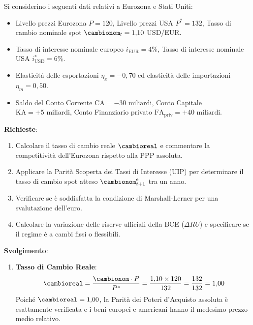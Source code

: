 \begin{esercizio}
Si considerino i seguenti dati relativi a Eurozona e Stati Uniti:
\begin{itemize}
    \item Livello prezzi Eurozona $P = 120$, Livello prezzi USA $P^* = 132$, Tasso di cambio nominale spot $\cambionom_t = 1{,}10$ USD/EUR.
    \item Tasso di interesse nominale europeo $i_{\text{EUR}} = 4$\%, Tasso di interesse nominale USA $i_{\text{USD}}^* = 6$\%.
    \item Elasticità delle esportazioni $\eta_x = -0{,}70$ ed elasticità delle importazioni $\eta_m = 0{,}50$.
    \item Saldo del Conto Corrente $\mathrm{CA} = -30\text{ miliardi}$, Conto Capitale $\mathrm{KA} = +5\text{ miliardi}$, Conto Finanziario privato $\mathrm{FA}_{\text{priv}} = +40\text{ miliardi}$.
\end{itemize}
\textbf{Richieste}:
\begin{enumerate}
    \item Calcolare il tasso di cambio reale $\cambioreal$ e commentare la competitività dell'Eurozona rispetto alla PPP assoluta.
    \item Applicare la Parità Scoperta dei Tassi di Interesse (UIP) per determinare il tasso di cambio spot atteso $\cambionom_{t+1}^{\mathrm{e}}$ tra un anno.
    \item Verificare se è soddisfatta la condizione di Marshall-Lerner per una svalutazione dell'euro.
    \item Calcolare la variazione delle riserve ufficiali della BCE ($\Delta RU$) e specificare se il regime è a cambi fissi o flessibili.
\end{enumerate}

\textbf{Svolgimento}:
\begin{enumerate}
    \item \textbf{Tasso di Cambio Reale}:
    \begin{equation*}
        \cambioreal = \frac{\cambionom \cdot P}{P^*} = \frac{1{,}10 \times 120}{132} = \frac{132}{132} = 1{,}00
    \end{equation*}
    Poiché $\cambioreal = 1{,}00$, la Parità dei Poteri d'Acquisto assoluta è esattamente verificata e i beni europei e americani hanno il medesimo prezzo medio relativo.


\end{enumerate}
\end{esercizio}
